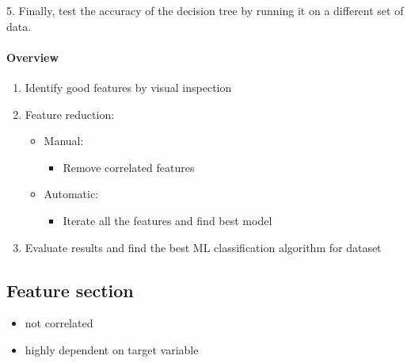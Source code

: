 5. Finally, test the accuracy of the decision tree by running it on a different set of data.
















\paragraph{Overview} 
\begin{enumerate}
    \item Identify good features by visual inspection 
    \item Feature reduction:
        \begin{itemize}
            \item Manual:
                \begin{itemize}
                    \item Remove correlated features
                \end{itemize}
                
            \item Automatic:
                \begin{itemize}
                    \item Iterate all the features and find best model 
                \end{itemize}
                
        \end{itemize}
        
    \item Evaluate results and find the best ML classification algorithm for dataset 
    
\end{enumerate}


\subsection{Feature section}
\begin{itemize}
    \item not correlated
    \item highly dependent on target variable 
\end{itemize}





